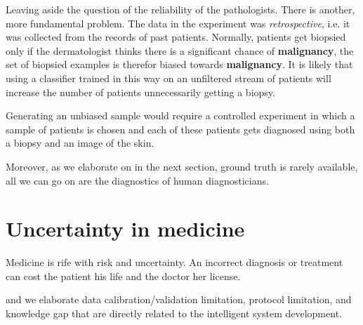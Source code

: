 \documentclass[11pt]{pnas-new}
\begin{document}
Leaving aside the question of the reliability of the
pathologists. There is another, more fundamental problem. The data
in the experiment was {\em retrospective}, i.e. it was collected from
the records of past patients. Normally, patients get
biopsied only if the dermatologist thinks there is a significant chance of
{\bf malignancy}, the set of biopsied examples is therefor biased towards
{\bf malignancy}. It is likely that using a classifier trained in this way
on an unfiltered stream of patients will increase the number of
patients unnecessarily getting a biopsy.

Generating an unbiased sample would require a controlled experiment in
which a sample of patients is chosen and each of these patients gets
diagnosed using both a biopsy and an image of the skin.


Moreover, as we elaborate on in the next section, ground truth is
rarely available, all we can go on are the diagnostics of human diagnosticians.

\section{Uncertainty in medicine}

Medicine is rife with risk and uncertainty. An incorrect diagnosis or
treatment can cost the patient his life and the doctor her license.



\iffalse
and we elaborate data calibration/validation limitation, protocol limitation, and knowledge gap that are directly related to the intelligent system development. 
\end{document}
